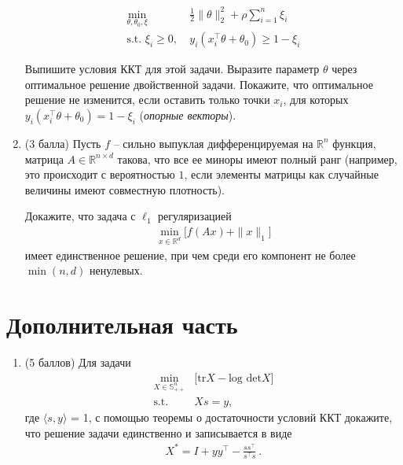 \begin{enumerate}[label=\textbf{Задача \arabic*.}]
    \begin{align*}
        \min_{\theta, \theta_0, \xi} &~ \frac{1}{2}\|\theta\|_2^2 + \rho\sum\limits_{i = 1}^{n}\xi_i\\
        \text{s.t. } \xi_i \geq 0, &~ y_i(x_i^\top \theta + \theta_0) \geq 1 - \xi_i
    \end{align*}

    Выпишите условия ККТ для этой задачи. Выразите параметр $\theta$ через оптимальное решение двойственной задачи. Покажите, что оптимальное решение не изменится, если оставить только точки $x_i$, для которых $y_i(x_i^\top \theta + \theta_0) = 1 - \xi_i$ (\emph{опорные векторы}).

    \item (3 балла) Пусть $f$ -- сильно выпуклая дифференцируемая на $\mathbb{R}^n$ функция, матрица $A \in \mathbb{R}^{n \times d}$ такова, что все ее миноры имеют полный ранг (например, это происходит с вероятностью $1$, если элементы матрицы как случайные величины имеют совместную плотность).
    
    Докажите, что задача с $\ell_1$ регуляризацией 
    \begin{align*}
         \min_{x \in \mathbb{R}^d} \bigg[f(Ax) + \|x\|_1\bigg]
    \end{align*}
    имеет единственное решение, при чем среди его компонент не более $\min(n, d)$ ненулевых.

        
\end{enumerate}


\section*{Дополнительная часть}

\begin{enumerate}[label=\textbf{Задача \arabic*.}]

    \item (5 баллов) Для задачи 
    \begin{align*}
        \min_{X \in \mathbb{S}^n_{++}} & \bigg[\text{tr} X - \text{log det} X\bigg] \\
        \text{s.t. } & Xs = y,
    \end{align*}
    где $\langle s, y \rangle$ = 1, с помощью теоремы о достаточности условий ККТ докажите, что решение задачи единственно и записывается в виде
    \begin{align*}
        X^* = I + yy^\top - \frac{ss^\top}{s^\top s} ~ .
    \end{align*}

\end{enumerate}